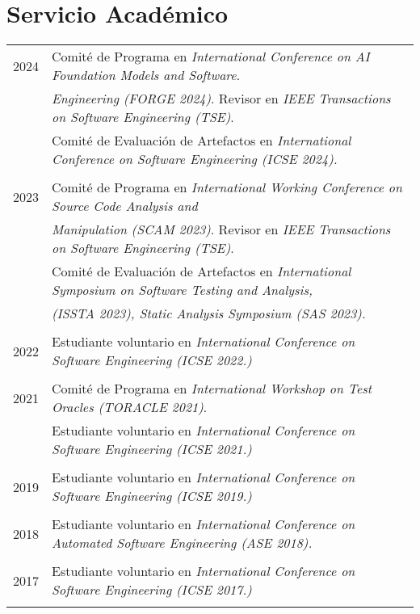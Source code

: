 \documentclass[a4paper,10pt]{article} %
\begin{document}
\section{Servicio Académico}
\begin{longtable}{rl}

\textsc{2024} & Comité de Programa en \textit{International Conference on AI Foundation Models and Software}. \\ 
& \textit{Engineering (FORGE 2024)}. Revisor en \textit{IEEE Transactions on Software Engineering (TSE)}. \\
& Comité de Evaluación de Artefactos en \textit{International Conference on Software Engineering (ICSE 2024).} \\ & \\

\textsc{2023} & Comité de Programa en \textit{International Working Conference on Source Code Analysis and} \\ 
& \textit{Manipulation (SCAM 2023)}. Revisor en \textit{IEEE Transactions on Software Engineering (TSE)}. \\
& Comité de Evaluación de Artefactos en \textit{International Symposium on Software Testing and Analysis,} \\ 
& \textit{(ISSTA 2023), Static Analysis Symposium (SAS 2023).} \\ & \\

\textsc{2022} & Estudiante voluntario en \textit{International Conference on Software Engineering (ICSE 2022.)} \\ & \\ 

\textsc{2021} & Comité de Programa en \textit{International Workshop on Test Oracles (TORACLE 2021)}. \\
& Estudiante voluntario en \textit{International Conference on Software Engineering (ICSE 2021.)} \\ & \\

\textsc{2019} & Estudiante voluntario en \textit{International Conference on Software Engineering (ICSE 2019.)} \\ & \\ 

\textsc{2018} & Estudiante voluntario en \textit{International Conference on Automated Software Engineering (ASE 2018).} \\ & \\ 

\textsc{2017} & Estudiante voluntario en \textit{International Conference on Software Engineering (ICSE 2017.)} \\ & \\ 

\end{longtable}
\end{document}
